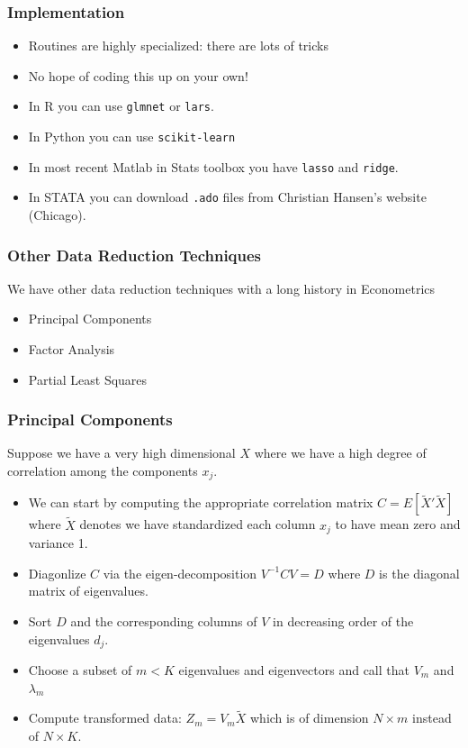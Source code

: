 \begin{frame}
\frametitle{Implementation}
\begin{itemize}
\item Routines are highly specialized: there are lots of tricks
\item No hope of coding this up on your own!
\item In R you can use \texttt{glmnet} or \texttt{lars}.
\item In Python you can use \texttt{scikit-learn}
\item In most recent Matlab in Stats toolbox you have \texttt{lasso} and \texttt{ridge}.
\item In STATA you can download \texttt{.ado} files from Christian Hansen's website (Chicago).
\end{itemize}
\end{frame}

\begin{frame}
\frametitle{Other Data Reduction Techniques}
We have other data reduction techniques with a long history in Econometrics
\begin{itemize}
\item Principal Components
\item Factor Analysis
\item Partial Least Squares
\end{itemize}
\end{frame}

\begin{frame}
\frametitle{Principal Components}
Suppose we have a very high dimensional $X$ where we have a high degree of correlation among the components $x_j$. 
\begin{itemize}
\item We can start by computing the appropriate correlation matrix $C=E[\tilde{X}'\tilde{X}]$ where $\tilde{X}$ denotes we have standardized each column $x_j$ to have mean zero and variance 1.
\item Diagonlize $C$ via the eigen-decomposition $V^{-1} C V = D$ where $D$ is the diagonal matrix of eigenvalues.
\item Sort $D$ and the corresponding columns of $V$ in decreasing order of the eigenvalues $d_j$.
\item Choose a subset of $m < K$ eigenvalues and eigenvectors and call that $V_m$ and $\lambda_m$
\item Compute transformed data: $Z_m = V_m \tilde{X}$ which is of dimension $N \times m$ instead of $N \times K$.
\end{itemize}
\end{frame}

